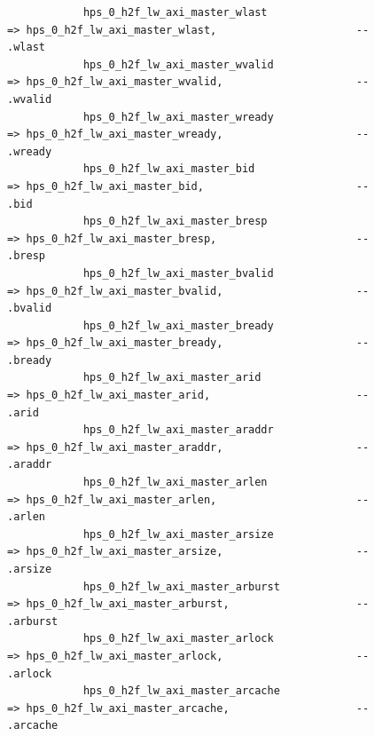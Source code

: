 \documentclass[conference]{IEEEtran}
\begin{document}
\begin{lstlisting}
			hps_0_h2f_lw_axi_master_wlast                                       => hps_0_h2f_lw_axi_master_wlast,                      --                                                              .wlast
			hps_0_h2f_lw_axi_master_wvalid                                      => hps_0_h2f_lw_axi_master_wvalid,                     --                                                              .wvalid
			hps_0_h2f_lw_axi_master_wready                                      => hps_0_h2f_lw_axi_master_wready,                     --                                                              .wready
			hps_0_h2f_lw_axi_master_bid                                         => hps_0_h2f_lw_axi_master_bid,                        --                                                              .bid
			hps_0_h2f_lw_axi_master_bresp                                       => hps_0_h2f_lw_axi_master_bresp,                      --                                                              .bresp
			hps_0_h2f_lw_axi_master_bvalid                                      => hps_0_h2f_lw_axi_master_bvalid,                     --                                                              .bvalid
			hps_0_h2f_lw_axi_master_bready                                      => hps_0_h2f_lw_axi_master_bready,                     --                                                              .bready
			hps_0_h2f_lw_axi_master_arid                                        => hps_0_h2f_lw_axi_master_arid,                       --                                                              .arid
			hps_0_h2f_lw_axi_master_araddr                                      => hps_0_h2f_lw_axi_master_araddr,                     --                                                              .araddr
			hps_0_h2f_lw_axi_master_arlen                                       => hps_0_h2f_lw_axi_master_arlen,                      --                                                              .arlen
			hps_0_h2f_lw_axi_master_arsize                                      => hps_0_h2f_lw_axi_master_arsize,                     --                                                              .arsize
			hps_0_h2f_lw_axi_master_arburst                                     => hps_0_h2f_lw_axi_master_arburst,                    --                                                              .arburst
			hps_0_h2f_lw_axi_master_arlock                                      => hps_0_h2f_lw_axi_master_arlock,                     --                                                              .arlock
			hps_0_h2f_lw_axi_master_arcache                                     => hps_0_h2f_lw_axi_master_arcache,                    --                                                              .arcache

\end{lstlisting}
\end{document}
